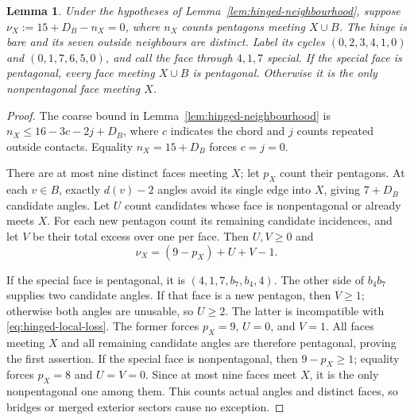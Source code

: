 \documentclass[11pt]{article}
\newtheorem{lemma}[theorem]{Lemma}
\theoremstyle{remark}
\numberwithin{equation}{section}
\numberwithin{table}{section}
\begin{document}
\begin{lemma}\label{lem:tight-hinged-neighbourhood}
Under the hypotheses of Lemma~\ref{lem:hinged-neighbourhood}, suppose
$\nu_X:=15+D_B-n_X=0$, where $n_X$ counts pentagons meeting
$X\cup B$. The hinge is bare and its seven outside neighbours are
distinct. Label its cycles $(0,2,3,4,1,0)$ and $(0,1,7,6,5,0)$,
and call the face through $4,1,7$ special. If the special face is
pentagonal, every face meeting $X\cup B$ is pentagonal. Otherwise
it is the only nonpentagonal face meeting $X$.
\end{lemma}
\begin{proof}
The coarse bound in Lemma~\ref{lem:hinged-neighbourhood} is
$n_X\le16-3c-2j+D_B$, where $c$ indicates the chord and $j$ counts
repeated outside contacts. Equality $n_X=15+D_B$ forces $c=j=0$.

There are at most nine distinct faces meeting $X$; let $p_X$ count
their pentagons. At each $v\in B$, exactly $d(v)-2$ angles avoid
its single edge into $X$, giving $7+D_B$ candidate angles. Let $U$
count candidates whose face is nonpentagonal or already meets $X$.
For each new pentagon count its remaining candidate incidences, and
let $V$ be their total excess over one per face. Then $U,V\ge0$ and
\begin{equation}\label{eq:hinged-local-loss}
 \nu_X=(9-p_X)+U+V-1.
\end{equation}

If the special face is pentagonal, it is
$(4,1,7,b_7,b_4,4)$. The other side of $b_4b_7$ supplies two candidate
angles. If that face is a new pentagon, then $V\ge1$; otherwise
both angles are unusable, so $U\ge2$. The latter is incompatible
with \eqref{eq:hinged-local-loss}. The former forces
$p_X=9$, $U=0$, and $V=1$. All faces meeting $X$ and all remaining
candidate angles are therefore pentagonal, proving the first assertion.
If the special face is nonpentagonal, then $9-p_X\ge1$; equality
forces $p_X=8$ and $U=V=0$. Since at most nine faces meet $X$, it is
the only nonpentagonal one among them. This counts actual angles and
distinct faces, so bridges or merged exterior sectors cause no exception.
\end{proof}
\end{document}
